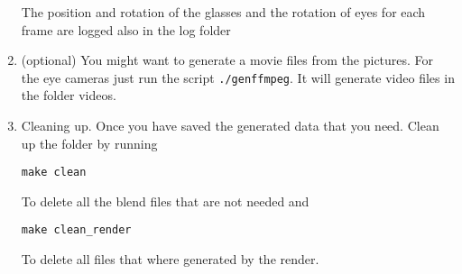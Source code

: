 \begin{enumerate}
	The position and rotation of the glasses and the rotation of eyes for each frame are logged also in the log folder
	\item(optional) You might want to generate a movie files from the pictures. For the eye cameras just run the script \texttt{./genffmpeg}. It will generate video files in the folder videos.
	\item Cleaning up. Once you have saved the generated data that you need. Clean up the folder by running
	
	\texttt{make clean}
	
	To delete all the blend files that are not needed and
	
	\texttt{make clean\_render}
	
	To delete all files that where generated by the render. 
	
	

	
	
	
	
\end{enumerate}